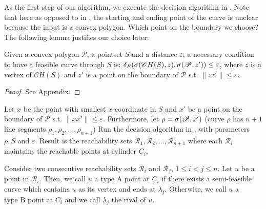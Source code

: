 \documentclass[a4paper,UKenglish]{lipics}
\newcommand{\eps}{\varepsilon}
\newcommand{\CR}{{\mathscr R}}
\newcommand{\Pol}{{\mathscr P}}
\newcommand{\CH}{{\mathscr CH}}
\newcommand{\R}{\CR}
\newcommand{\distF}{\delta_F}
\newcommand{\pset}{S}
\newcommand{\Qs}{x} \newcommand{\Ps}{x'} \newcommand{\Good}{\mbox{type A}}
\newcommand{\SemiBad}{\mbox{type B}}
\newcommand{\lme}[1]{{\lambda_{#1}}}
\begin{document}
As the first step of our algorithm, 
we execute the decision algorithm in \cite{cccg11}. 
Note that here as opposed to in \cite{cccg11}, 
the starting and ending point of 
the curve is unclear because the input is a convex polygon.
Which point on the boundary we choose?
The following lemma justifies our choice later:



\begin{lemma} \label{lema:convexhull}
Given a convex polygon $\Pol$, a pointset $\pset$ and a distance $\eps$,
a necessary condition to have a feasible 
curve through $S$ is: 
$\distF(\sigma(\CH(\pset),z), \bounC{z'} ) \le \eps$, 
where $z$ is a vertex of $\CH(\pset)$ and $z'$ is a point on the boundary of $\Pol$ s.t. $\|zz'\| \le \eps$.
\end{lemma}




\begin{proof}
See Appendix.
\end{proof}






Let $\Qs$ be the point with 
smallest $x$-coordinate in $\pset$
and $\Ps$ be a point on the boundary of $\Pol$
s.t.   $\|\Qs\Ps\| \le \eps$. Furthermore, 
let $\rho = \bounC{\Ps}$ (curve $\rho$ has $n+1$ line segments
$\rho_1, \rho_2, \dots ,\rho_{n+1}$) 
Run the decision algorithm in \cite{cccg11}, 
with parameters $\rho, \pset$ and $\eps$.
Result is the reachability sets 
$\R_1, \R_2, \dots ,\R_{n+1}$ where each $\R_i$ maintains the reachable points at cylinder $C_i$. 



















\begin{definition}
\label{def:Types}

Consider  two consecutive reachability 
sets  $\R_i$ and $\R_j$, $ 1 \le i<j\le n$.
Let $u$ be a point in $\R_i$. Then, we call $u$
a $\Good$ point at $C_i$ if  there exists a semi-feasible
curve which contains $u$ as its vertex
and ends at $\lme{j}$.
Otherwise, we call $u$ a $\SemiBad$ point at $C_i$ 
and we call $\lme{j}$ the rival of $u$. 
\end{definition}
\end{document}
